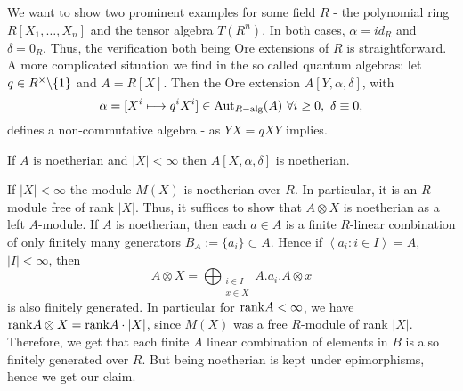 \en
\bsp We want to show two prominent examples for some field $R$ - the polynomial ring $R[X_1,\ldots,X_n]$ and the tensor algebra $T(R^n)$. In both cases, $\alpha = id_R$ and $\delta = 0_R$. Thus, the verification both being Ore extensions of $R$ is straightforward.\\
\indent A more complicated situation we find in the so called quantum algebras: let $q \in R^\times \backslash\{1\}$ and $A = R[X]$. Then the Ore extension $A[Y, \alpha, \delta]$, with
$$\alpha = [X^i \longmapsto q^i X^i] \in \mathrm{Aut}_{R-\mathrm{alg}}(A)\ \forall i \geq 0,\ \delta \equiv 0,$$
defines a non-commutative algebra - as $Y X = q X Y$ implies.
\begin{prop}\label{prop04}
If $A$ is noetherian and $|X| < \infty$ then $A[X,\alpha,\delta]$ is noetherian.
\end{prop}
\bws If $|X| < \infty$ the module $M(X)$ is noetherian over $R$. In particular, it is an $R$-module free of rank $|X|$. Thus, it suffices to show that $A \otimes X$ is noetherian as a left $A$-module. If $A$ is noetherian, then each $a \in A$ is a finite $R$-linear combination of only finitely many generators $B_A := \{a_i\} \subset A$. Hence if $\left<a_i : i \in I\right> = A$, $|I| < \infty$, then
$$A \otimes X = \bigoplus_{\substack{i \in I\\x \in X}} A.a_i.A \otimes x$$
is also finitely generated. In particular for $\textrm{rank} A < \infty$, we have $\textrm{rank} A \otimes X = \textrm{rank} A \cdot |X|$, since $M(X)$ was a free $R$-module of rank $|X|$. Therefore, we get that each finite $A$ linear combination of elements in $B$ is also finitely generated over $R$. But being noetherian is kept under epimorphisms, hence we get our claim.
